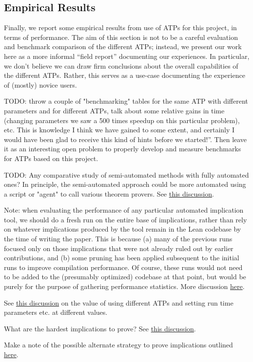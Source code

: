 \subsection{Empirical Results}

Finally, we report some empirical results from use of ATPs for this project, in terms of performance.
The aim of this section is not to be a careful evaluation and benchmark comparison of the different ATPs; instead, we present our work here as a more informal ``field report'' documenting our experiences.
In particular, we don't believe we can draw firm conclusions about the overall capabilities of the different ATPs.
Rather, this serves as a use-case documenting the experience of (mostly) novice users.

TODO: throw a couple of "benchmarking" tables for the same ATP with different parameters and for different ATPs, talk about some relative gains in time (changing parameters we saw a 500 times speedup on this particular problem), etc. This is knowledge I think we have gained to some extent, and certainly I would have been glad to receive this kind of hints before we started!''.  Then leave it as an interesting open problem to properly develop and measure benchmarks for ATPs based on this project.

TODO: Any comparative study of semi-automated methods with fully automated ones? In principle, the semi-automated approach could be more automated using a script or "agent" to call various theorem provers. See \href{https://leanprover.zulipchat.com/#narrow/stream/458659-Equational/topic/A.20magma.20of.20order.20.3C.2013.20-.20for.20Equation2531.3F}{this discussion}.

Note: when evaluating the performance of any particular automated implication tool, we should do a fresh run on the entire base of implications, rather than rely on whatever implications produced by the tool remain in the Lean codebase by the time of writing the paper. This is because (a) many of the previous runs focused only on those implications that were not already ruled out by earlier contributions, and (b) some pruning has been applied subsequent to the initial runs to improve compilation performance. Of course, these runs would not need to be added to the (presumably optimized) codebase at that point, but would be purely for the purpose of gathering performance statistics. More discussion \href{https://leanprover.zulipchat.com/#narrow/stream/458659-Equational/topic/RECORDS.20REQUEST.3A.20data.20and.20performance.20automated.20run.20metrics}{here}.

See \href{https://leanprover.zulipchat.com/#narrow/channel/458659-Equational/topic/1516.20-.3E.20255/near/481547543}{this discussion} on the value of using different ATPs and setting run time parameters etc. at different values.

What are the hardest implications to prove?  See \href{https://leanprover.zulipchat.com/#narrow/channel/458659-Equational/topic/What.20are.20the.20hardest.20positive.20implications.20for.20an.20ATP.3F}{this discussion}.

Make a note of the possible alternate strategy to prove implications outlined \href{https://leanprover.zulipchat.com/#narrow/stream/458659-Equational/topic/Ideas.20for.20unknown.20implications}{here}.
